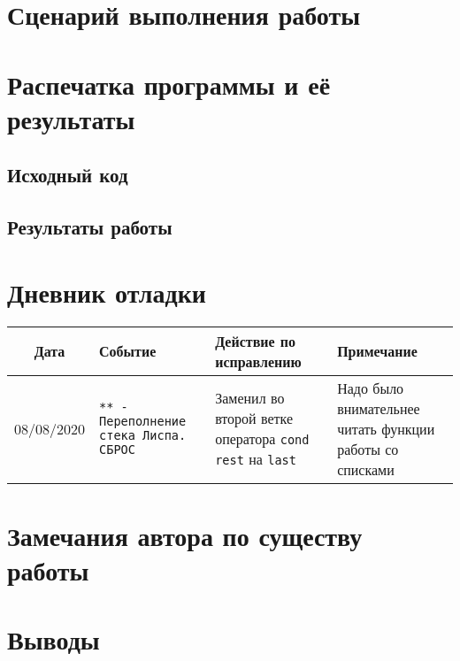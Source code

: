 \documentclass[12pt]{article}
\begin{document}
\section{Сценарий выполнения работы}

\section{Распечатка программы и её результаты}

\subsection{Исходный код}

\subsection{Результаты работы}

\section{Дневник отладки}
\noindent
\begin{tabularx}{\linewidth}{|c|X|X|X|}
\hline
Дата & Событие & Действие по исправлению & Примечание \\
\hline
08/08/2020 & {\tt *** - Переполнение стека Лиспа. СБРОС} & Заменил во второй ветке оператора {\tt cond} {\tt rest} на {\tt last} & Надо было внимательнее читать функции работы со списками\\
\hline
\end{tabularx}

\section{Замечания автора по существу работы}

\section{Выводы}
\end{document}
